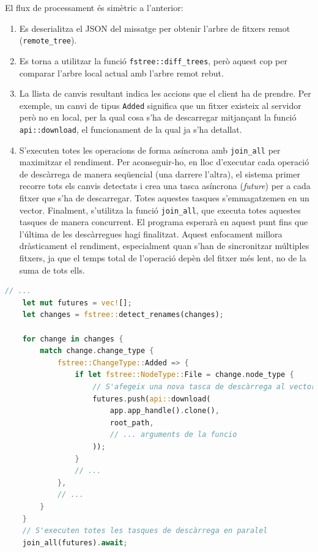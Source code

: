 El flux de processament és simètric a l'anterior:
\begin{enumerate}
    \item Es deserialitza el JSON del missatge per obtenir l'arbre de fitxers remot (\texttt{remote\_tree}).
    \item Es torna a utilitzar la funció \texttt{fstree::diff\_trees}, però aquest cop per comparar l'arbre local actual amb l'arbre remot rebut.
    \item La llista de canvis resultant indica les accions que el client ha de prendre. Per exemple, un canvi de tipus \texttt{Added} significa que un fitxer existeix al servidor però no en local, per la qual cosa s'ha de descarregar mitjançant la funció \texttt{api::download}, el funcionament de la qual ja s'ha detallat.
    \item S'executen totes les operacions de forma asíncrona amb \texttt{join\_all} per maximitzar el rendiment. Per aconseguir-ho, en lloc d'executar cada operació de descàrrega de manera seqüencial (una darrere l'altra), el sistema primer recorre tots els canvis detectats i crea una tasca asíncrona (\textit{future}) per a cada fitxer que s'ha de descarregar. Totes aquestes tasques s'emmagatzemen en un vector. Finalment, s'utilitza la funció \texttt{join\_all}, que executa totes aquestes tasques de manera concurrent. El programa esperarà en aquest punt fins que l'última de les descàrregues hagi finalitzat. Aquest enfocament millora dràsticament el rendiment, especialment quan s'han de sincronitzar múltiples fitxers, ja que el temps total de l'operació depèn del fitxer més lent, no de la suma de tots ells.
\end{enumerate}

\begin{lstlisting}[language=Rust, caption={Execució concurrent de descàrregues amb \texttt{join\_all} a \texttt{synchronizer.rs}}]
    // ...
    let mut futures = vec![];
    let changes = fstree::detect_renames(changes);
    
    for change in changes {
        match change.change_type {
            fstree::ChangeType::Added => {
                if let fstree::NodeType::File = change.node_type {
                    // S'afegeix una nova tasca de descàrrega al vector de futures
                    futures.push(api::download(
                        app.app_handle().clone(),
                        root_path,
                        // ... arguments de la funcio
                    ));
                }
                // ...
            },
            // ...
        }
    }
    // S'executen totes les tasques de descàrrega en paralel
    join_all(futures).await;
\end{lstlisting}

